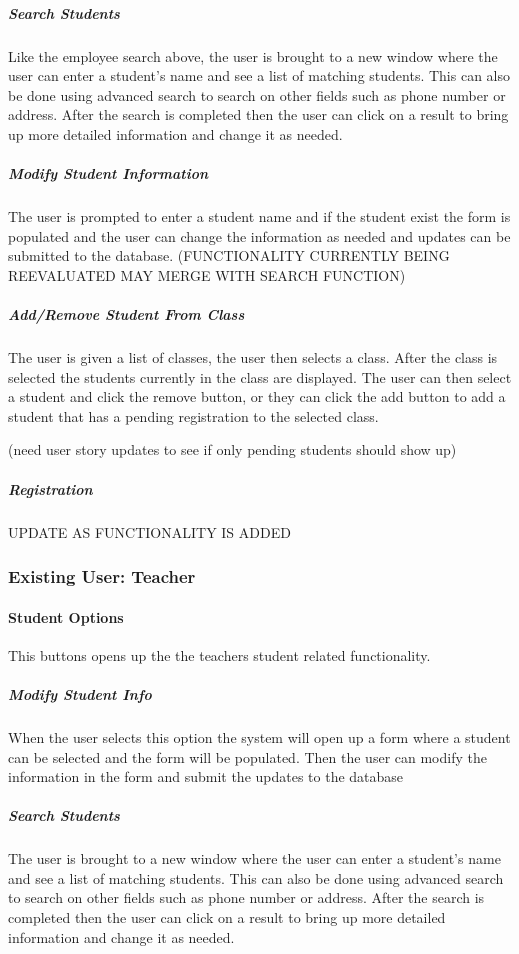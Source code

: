 \subparagraph{Search Students}
Like the employee search above, the user is brought to a new window where the user can enter a student's name and see a list of matching students. This can also be done using advanced search to search on other fields such as phone number or address. After the search is completed then the user can click on a result to bring up more detailed information and change it as needed. 

\subparagraph{Modify Student Information}
The user is prompted to enter a student name and if the student exist the form is populated and the user can change the information as needed and updates can be submitted to the database.
(FUNCTIONALITY CURRENTLY BEING REEVALUATED MAY MERGE WITH SEARCH FUNCTION)

\subparagraph{Add/Remove Student From Class}
The user is given a list of classes, the user then selects a class. After the class is selected the students currently in the class are displayed. The user can then select a student and click the remove button, or they can click the add button to add a student that has a pending registration to the selected class.

(need user story updates to see if only pending students should show up)


\subparagraph{Registration}
UPDATE AS FUNCTIONALITY IS ADDED


\subsubsection{Existing User: Teacher}

\paragraph{Student Options}
\textmd{This buttons opens up the the teachers student related functionality.}

\subparagraph{Modify Student Info}
\textmd{When the user selects this option the system will open up a form where a student can be selected and the form will be populated. Then the user can modify the information in the form and submit the updates to the database}

\subparagraph{Search Students}
\textmd{The user is brought to a new window where the user can enter a student's name and see a list of matching students. This can also be done using advanced search to search on other fields such as phone number or address. After the search is completed then the user can click on a result to bring up more detailed information and change it as needed. }


